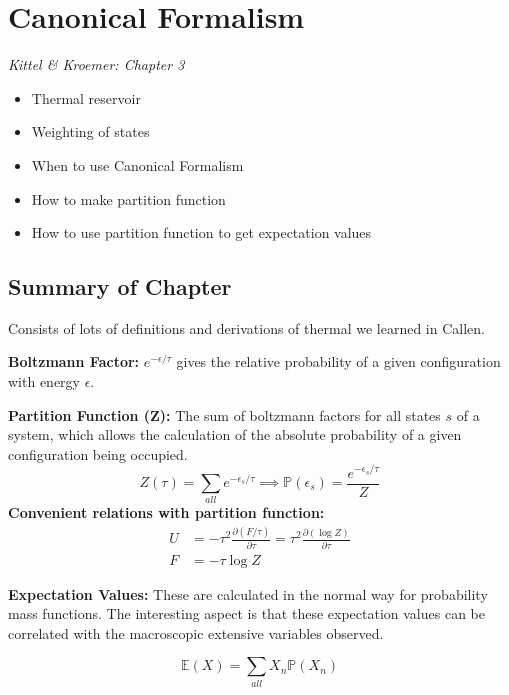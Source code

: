 \section{Canonical Formalism}

\emph{Kittel \& Kroemer: Chapter 3}
\begin{itemize}
    \item Thermal reservoir
    \item Weighting of states
    \item When to use Canonical Formalism 
    \item How to make partition function
    \item How to use partition function to get expectation values
\end{itemize}

\subsection{Summary of Chapter}
Consists of lots of definitions and derivations of thermal we learned in Callen.

\textbf{Boltzmann Factor: } $e^{-\epsilon/\tau}$ gives the relative probability of a given configuration with energy $\epsilon$.

\textbf{Partition Function (Z): } The sum of boltzmann factors for all states $s$ of a system, which allows the calculation of the absolute probability of a given configuration being occupied.
\[
Z(\tau) = \sum_{all} e^{-\epsilon_s/\tau} \implies \mathbb{P}(\epsilon_s) = \frac {e^{-\epsilon_s/\tau}}{Z}
\]
\textbf{Convenient relations with partition function: }
\begin{align*}
    U & = -\tau^2 \frac{\partial (F/\tau)}{\partial\tau} =  \tau^2 \frac{\partial (\log{Z})}{\partial\tau}\\
    F & = -\tau \log{Z}
\end{align*}

\textbf{Expectation Values: } These are calculated in the normal way for probability mass functions. The interesting aspect is that these expectation values can be correlated with the macroscopic extensive variables observed.

\[
\mathbb{E}(X) = \sum_{all} X_n \mathbb{P}(X_n) 
\]
